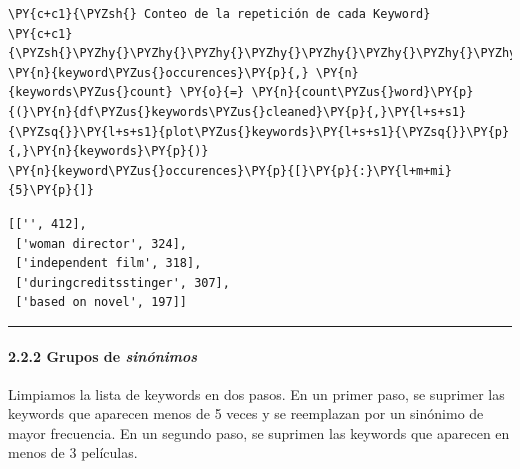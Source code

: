     \begin{tcolorbox}[breakable, size=fbox, boxrule=1pt, pad at break*=1mm,colback=cellbackground, colframe=cellborder]
\begin{Verbatim}[commandchars=\\\{\}]
\PY{c+c1}{\PYZsh{} Conteo de la repetición de cada Keyword}
\PY{c+c1}{\PYZsh{}\PYZhy{}\PYZhy{}\PYZhy{}\PYZhy{}\PYZhy{}\PYZhy{}\PYZhy{}\PYZhy{}\PYZhy{}\PYZhy{}\PYZhy{}\PYZhy{}\PYZhy{}\PYZhy{}\PYZhy{}\PYZhy{}\PYZhy{}\PYZhy{}\PYZhy{}\PYZhy{}\PYZhy{}\PYZhy{}\PYZhy{}\PYZhy{}\PYZhy{}\PYZhy{}\PYZhy{}\PYZhy{}\PYZhy{}\PYZhy{}\PYZhy{}\PYZhy{}\PYZhy{}\PYZhy{}}
\PY{n}{keyword\PYZus{}occurences}\PY{p}{,} \PY{n}{keywords\PYZus{}count} \PY{o}{=} \PY{n}{count\PYZus{}word}\PY{p}{(}\PY{n}{df\PYZus{}keywords\PYZus{}cleaned}\PY{p}{,}\PY{l+s+s1}{\PYZsq{}}\PY{l+s+s1}{plot\PYZus{}keywords}\PY{l+s+s1}{\PYZsq{}}\PY{p}{,}\PY{n}{keywords}\PY{p}{)}
\PY{n}{keyword\PYZus{}occurences}\PY{p}{[}\PY{p}{:}\PY{l+m+mi}{5}\PY{p}{]}
\end{Verbatim}
\end{tcolorbox}

            \begin{tcolorbox}[breakable, boxrule=.5pt, size=fbox, pad at break*=1mm, opacityfill=0]
\begin{Verbatim}[commandchars=\\\{\}]
[['', 412],
 ['woman director', 324],
 ['independent film', 318],
 ['duringcreditsstinger', 307],
 ['based on novel', 197]]
\end{Verbatim}
\end{tcolorbox}
        
    \begin{center}\rule{0.5\linewidth}{\linethickness}\end{center}

\paragraph{\texorpdfstring{2.2.2 Grupos de
\emph{sinónimos}}{2.2.2 Grupos de sinónimos}}\label{grupos-de-sinuxf3nimos}

Limpiamos la lista de keywords en dos pasos. En un primer paso, se
suprimer las keywords que aparecen menos de 5 veces y se reemplazan por
un sinónimo de mayor frecuencia. En un segundo paso, se suprimen las
keywords que aparecen en menos de 3 películas.

